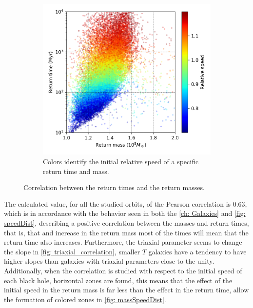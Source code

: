 \begin{figure}[h]
\begin{subfigure}[b]{0.49\textwidth}
			\includegraphics[width = \textwidth]{"../Files/Week 13/correlation_speed"}
			\caption{Colors identify the initial relative speed of a specific return time and mass.}
		\end{subfigure}
		\caption{Correlation between the return times and the return masses.}
		\label{fig: speed_correlation}
	\end{figure}
	
	The calculated value, for all the studied orbits, of the Pearson correlation is 0.63, which is in accordance with the behavior seen in both the \autoref{ch: Galaxies} and \autoref{fig: speedDist}, describing a positive correlation between the masses and return times, that is, that and increase in the return mass most of the times will mean that the return time also increases. Furthermore, the triaxial parameter seems to change the slope in \autoref{fig: triaxial_correlation}, smaller $T$ galaxies have a tendency to have higher slopes than galaxies with triaxial parameters close to the unity. Additionally, when the correlation is studied with respect to the initial speed of each black hole, horizontal zones are found, this means that the effect of the initial speed in the return mass is far less than the effect in the return time, allow the formation of colored zones in \autoref{fig: massSpeedDist}. 
	
